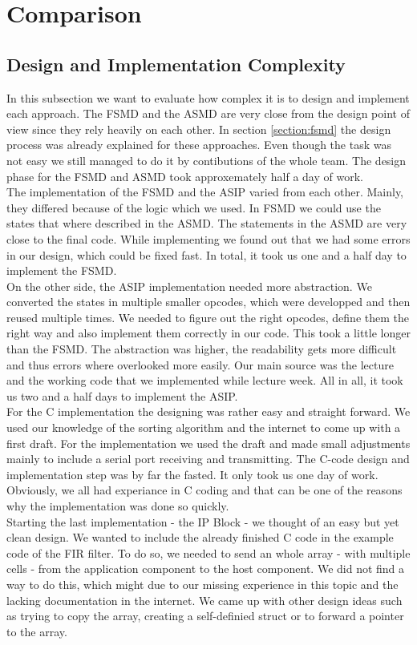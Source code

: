 \documentclass[conference]{IEEEtran}
\begin{document}
\section{Comparison}
\subsection{Design and Implementation Complexity}
In this subsection we want to evaluate how complex it is to design and implement each approach. The FSMD and the ASMD are very close from the design point of view since they rely heavily on each other. In section \autoref{section:fsmd} the design process was already explained for these approaches. Even though the task was not easy we still managed to do it by contibutions of the whole team. The design phase for the FSMD and ASMD took approxemately half a day of work. \\
The implementation of the FSMD and the ASIP varied from each other. Mainly, they differed because of the logic which we used. In FSMD we could use the states that where described in the ASMD. The statements in the ASMD are very close to the final code. While implementing we found out that we had some errors in our design, which could be fixed fast. In total, it took us one and a half day to implement the FSMD.\\
On the other side, the ASIP implementation needed more abstraction. We converted the states in multiple smaller opcodes, which were developped and then reused multiple times. We needed to figure out the right opcodes, define them the right way and also implement them correctly in our code. This took a little longer than the FSMD. The abstraction was higher, the readability gets more difficult and thus errors where overlooked more easily. Our main source was the lecture and the working code that we implemented while lecture week. All in all, it took us two and a half days to implement the ASIP. \\
For the C implementation the designing was rather easy and straight forward. We used our knowledge of the sorting algorithm and the internet to come up with a first draft. For the implementation we used the draft and made small adjustments mainly to include a serial port receiving and transmitting. The C-code design and implementation step was by far the fasted. It only took us one day of work. Obviously, we all had experiance in C coding and that can be one of the reasons why the implementation was done so quickly. \\
Starting the last implementation - the IP Block - we thought of an easy but yet clean design. We wanted to include the already finished C code in the example code of the FIR filter. To do so, we needed to send an whole array - with multiple cells - from the application component to the host component. We did not find a way to do this, which might due to our missing experience in this topic and the lacking documentation in the internet. We came up with other design ideas such as trying to copy the array, creating a self-definied struct or to forward a pointer to the array.\\ 
\end{document}
